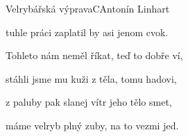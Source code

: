 \begin{song}{Velrybářská výprava}{C}{Antonín Linhart}
\begin{SBVerse}
tuhle práci zaplatil by asi jenom cvok.

\end{SBVerse}

\begin{SBVerse}

Tohleto nám neměl říkat, teď to dobře ví,

stáhli jsme mu kuži z těla, tomu hadovi,

z paluby pak slanej vítr jeho tělo smet,

máme velryb plný zuby, na to vezmi jed.

\end{SBVerse}

\end{song}

\pagebreak